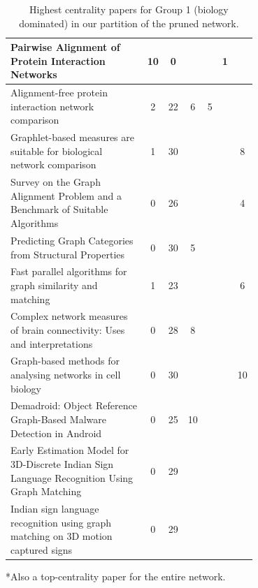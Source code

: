 \documentclass[12pt]{thesis}
\theoremstyle{plain}
\theoremstyle{definition}
\theoremstyle{remark}
\begin{document}
\begin{table}[H]
{\begin{tabular}{|L{0.7\linewidth}|c|c|c|c|c|c|}
Pairwise Alignment of Protein Interaction Networks & 10 & 0 &  &  & 1 &  \\ \hline
Alignment-free protein interaction network comparison & 2 & 22 & 6 & 5 &  &  \\ \hline
Graphlet-based measures are suitable for biological network comparison & 1 & 30 &  &  &  & 8 \\ \hline
Survey on the Graph Alignment Problem and a Benchmark of Suitable Algorithms & 0 & 26 &  &  &  & 4 \\ \hline
Predicting Graph Categories from Structural Properties & 0 & 30 & 5 &  &  &  \\ \hline
Fast parallel algorithms for graph similarity and matching & 1 & 23 &  &  &  & 6 \\ \hline
Complex network measures of brain connectivity: Uses and interpretations & 0 & 28 & 8 &  &  &  \\ \hline
Graph-based methods for analysing networks in cell biology & 0 & 30 &  &  &  & 10 \\ \hline
Demadroid: Object Reference Graph-Based Malware Detection in Android & 0 & 25 & 10 &  &  &  \\ \hline
Early Estimation Model for 3D-Discrete Indian Sign Language Recognition Using Graph Matching & 0 & 29 &  &  &  &  \\ \hline
Indian sign language recognition using graph matching on 3D motion captured signs & 0 & 29 &  &  &  &  \\ \hline
\end{tabular}
*Also a top-centrality paper for the entire network.}
\caption{Highest centrality papers for Group 1 (biology dominated) in our partition of the pruned network.}
\label{tab:toppapers_bio}
\end{table}
\end{document}
